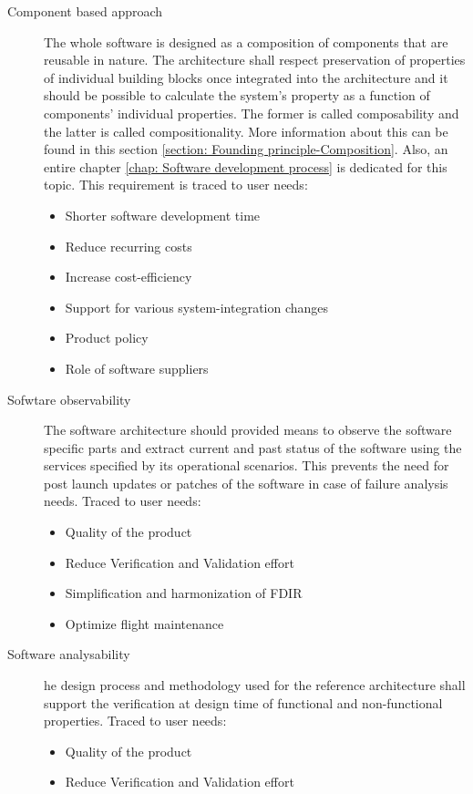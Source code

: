 \begin{description}
\item [Component based approach] The whole software is designed as a composition of components that are reusable in nature. The architecture shall respect preservation of properties of individual building blocks once integrated into the architecture and it should be possible to calculate the system's property as a function of components' individual properties. The former is called composability and the latter is called compositionality. More information about this can be found in this section \cref{section: Founding principle-Composition}. Also, an entire chapter \cref{chap: Software development process} is dedicated for this topic. This requirement is traced to user needs:
\begin{itemize}
\item Shorter software development time
\item Reduce recurring costs
\item Increase cost-efficiency
\item Support for various system-integration changes
\item Product policy
\item Role of software suppliers 
\end{itemize}
  
\item [Sofwtare observability] The software architecture should provided means to observe the software specific parts and extract current and past status of the software using the services specified by its operational scenarios. This prevents the need for post launch updates or patches of the software in case of failure analysis needs. Traced to user needs:
\begin{itemize}
\item Quality of the product
\item Reduce Verification and Validation effort
\item Simplification and harmonization of FDIR
\item Optimize flight maintenance 
\end{itemize} 

\item [Software analysability] he design process and methodology used for the reference architecture shall support the verification at design time of functional and non-functional properties. Traced to user needs:
\begin{itemize}
\item Quality of the product
\item Reduce Verification and Validation effort 
\end{itemize}


\end{description}
